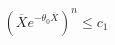 \documentclass[preview]{standalone}
\begin{document}
\begin{align*}
(\overline{X} e^{-\theta_0 \overline{X}})^n \leq c_1
\end{align*}
\end{document}
